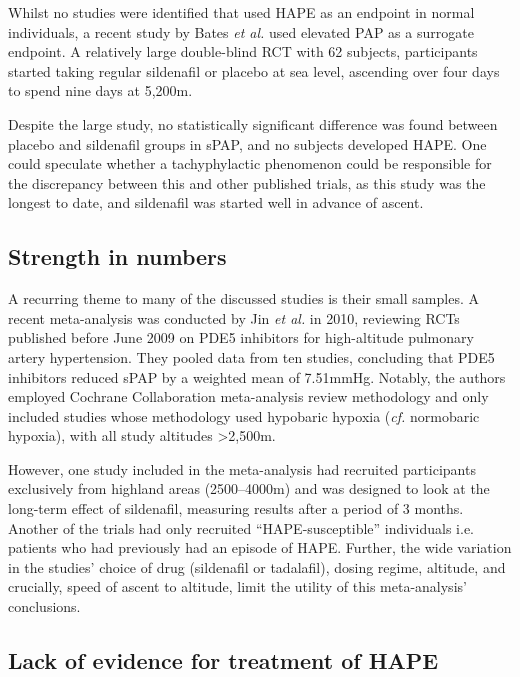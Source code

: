 \documentclass[12pt,a4paper]{article}
\begin{document}
Whilst no studies were identified that used HAPE as an endpoint in normal individuals, a recent study by Bates \emph{et al.} used elevated PAP as a surrogate endpoint.\cite{Bates:2011du} A relatively large double-blind RCT with 62 subjects, participants started taking regular sildenafil or placebo at sea level, ascending over four days to spend nine days at 5,200m.

Despite the large study, no statistically significant difference was found between placebo and sildenafil groups in sPAP, and no subjects developed HAPE. One could speculate whether a tachyphylactic phenomenon could be responsible for the discrepancy between this and other published trials, as this study was the longest to date, and sildenafil was started well in advance of ascent.

\subsection*{Strength in numbers}

A recurring theme to many of the discussed studies is their small samples. A recent meta-analysis was conducted by Jin \emph{et al.} in 2010, reviewing RCTs published before June 2009 on PDE5 inhibitors for high-altitude pulmonary artery hypertension.\cite{Jin:2010fc} They pooled data from ten studies, concluding that PDE5 inhibitors reduced sPAP by a weighted mean of 7.51mmHg. Notably, the authors employed Cochrane Collaboration meta-analysis review methodology and only included studies whose methodology used hypobaric hypoxia (\emph{cf.} normobaric hypoxia), with all study altitudes >2,500m.

However, one study included in the meta-analysis had recruited participants exclusively from highland areas (2500--4000m) and was designed to look at the long-term effect of sildenafil, measuring results after a period of 3 months.\cite{Aldashev:2005fr} Another of the trials had only recruited ``HAPE-susceptible'' individuals i.e. patients who had previously had an episode of HAPE.\cite{Maggiorini:2006kz} Further, the wide variation in the studies' choice of drug (sildenafil or tadalafil), dosing regime, altitude, and crucially, speed of ascent to altitude, limit the utility of this meta-analysis' conclusions.

\subsection*{Lack of evidence for treatment of HAPE}
\end{document}
